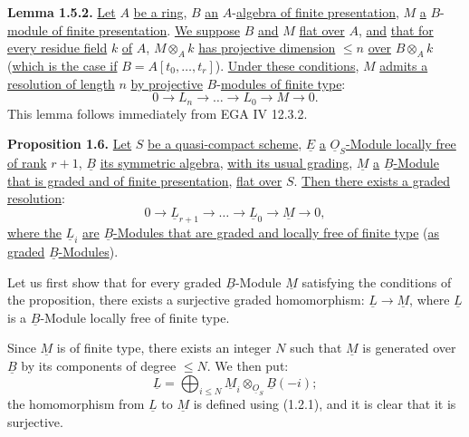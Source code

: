 %
\textbf{Lemma 1.5.2.} \uline{Let} \(A\) \uline{be a ring}, \(B\) \uline{an} \(A\)-\uline{algebra of finite presentation}, \(M\) \uline{a} \(B\)-\uline{module of finite presentation}. \uline{We suppose} \(B\) \uline{and} \(M\) \uline{flat over} \(A\), \uline{and} \uline{that for every residue field} \(k\) \uline{of} \(A\), \(M\otimes_A k\) \uline{has projective dimension} \(\leq n\) \uline{over} \(B\otimes_A k\) (\uline{which is the case if} \(B=A[t_0,\ldots,t_r]\)). \uline{Under these conditions}, \(M\) \uline{admits a resolution of length} \(n\) \uline{by projective} \(B\)-\uline{modules of finite type}:
\[
  0\longrightarrow L_n\longrightarrow\ldots\longrightarrow L_0\longrightarrow M\longrightarrow 0.
\]
This lemma follows immediately from EGA IV 12.3.2.

\textbf{Proposition 1.6.} \uline{Let} \(S\) \uline{be a quasi-compact scheme}, \(\underline{E}\) \uline{a} \(\underline{O}_S\)\uline{-Module locally free of rank} \(r+1\), \(\underline{B}\) \uline{its symmetric algebra}, \uline{with its usual grading}, \(\underline{M}\) \uline{a} \(\underline{B}\)\uline{-Module that is graded and of finite presentation}, \uline{flat over} \(S\). \uline{Then there exists a graded resolution}:
\[
  0\longrightarrow \underline{L}_{r+1}\longrightarrow\ldots\longrightarrow \underline{L}_0\longrightarrow \underline{M}\longrightarrow 0,
\]
\uline{where the} \(\underline{L}_i\) \uline{are} \(\underline{B}\)\uline{-Modules that are graded and locally free of finite type} (\uline{as graded} \(\underline{B}\)\uline{-Modules}).

Let us first show that for every graded \(\underline{B}\)-Module \(\underline{M}\) satisfying the conditions of the proposition, there exists a surjective graded homomorphism: \(\underline{L}\to \underline{M}\), where \(\underline{L}\) is a \(\underline{B}\)-Module locally free of finite type.

Since \(\underline{M}\) is of finite type, there exists an integer \(N\) such that \(\underline{M}\) is generated over \(\underline{B}\) by its components of degree \(\leq N\). We then put:
\[
  \underline{L}=\bigoplus_{i\leq N} \underline{M}_i\otimes_{\underline{O}_S}\underline{B}(-i);
\]
the homomorphism from \(\underline{L}\) to \(\underline{M}\) is defined using (1.2.1), and it is clear that it is surjective.

